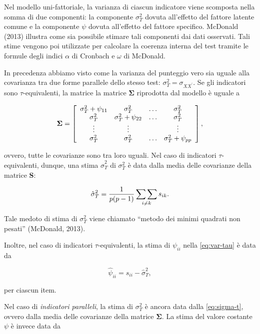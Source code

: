 \documentclass[
  11pt,
]{krantz}
\theoremstyle{definition}
\theoremstyle{definition}
\theoremstyle{definition}
\theoremstyle{definition}
\theoremstyle{remark}
\begin{document}
Nel modello uni-fattoriale, la varianza di ciascun indicatore viene scomposta nella somma di due componenti: la componente \(\sigma^2_T\) dovuta all'effetto del fattore latente comune e la componente \(\psi\) dovuta all'effetto del fattore specifico. McDonald (2013) illustra come sia possibile stimare tali componenti dai dati osservati. Tali stime vengono poi utilizzate per calcolare la coerenza interna del test tramite le formule degli indici \(\alpha\) di Cronbach e \(\omega\) di McDonald.

In precedenza abbiamo visto come la varianza del punteggio vero sia uguale alla covarianza tra due forme parallele dello stesso test: \(\sigma^2_T = \sigma_{XX^\prime}\). Se gli indicatori sono \(\tau\)-equivalenti, la matrice la matrice \(\boldsymbol{\Sigma}\) riprodotta dal modello è uguale a

\[
\boldsymbol{\Sigma}=\left[
      \begin{array}{ c c c c }
        \sigma_{T}^2 + \psi_{11} & \sigma_{T}^2 & \dots & \sigma_{T}^2 \\
        \sigma_{T}^2 & \sigma_{T}^2 + \psi_{22} & \dots & \sigma_{T}^2 \\
        \vdots & \vdots & & \vdots\\
        \sigma_{T}^2 & \sigma_{T}^2 & \dots & \sigma_{T}^2 + \psi_{pp} \notag
      \end{array}
    \right],
\]

ovvero, tutte le covarianze sono tra loro uguali. Nel caso di indicatori \(\tau\)-equivalenti, dunque, una stima \(\hat{\sigma}^2_T\) di \(\sigma^2_T\) è data dalla media delle covarianze della matrice \textbf{S}:

\begin{equation}
\hat{\sigma}_T^2 = \frac{1}{p(p-1)} \sideset{}{} {\sum \sum}_{i \neq k} s_{ik}.
\label{eq:sigma-t}
\end{equation}

Tale medoto di stima di \(\sigma^2_T\) viene chiamato ``metodo dei minimi quadrati non pesati'' (McDonald, 2013).

Inoltre, nel caso di indicatori \(\tau\)-equivalenti, la stima di \(\psi_{ii}\) nella \eqref{eq:var-tau} è data da

\[
\hat{\psi}_{ii }= s_{ii} - \hat{\sigma}_T^2,
\]

per ciascun item.

Nel caso di \emph{indicatori paralleli}, la stima di \(\sigma^2_T\) è ancora data dalla \eqref{eq:sigma-t}, ovvero dalla media delle covarianze della matrice \(\boldsymbol{\Sigma}\). La stima del valore costante \(\psi\) è invece data da
\end{document}
